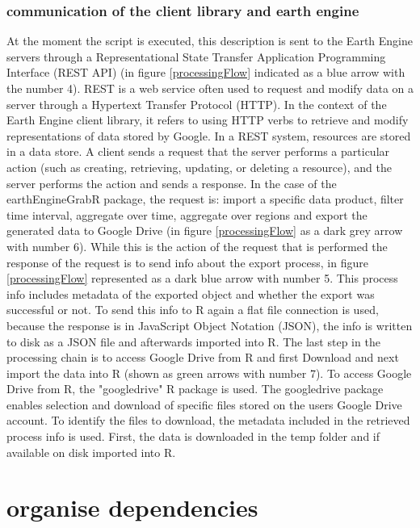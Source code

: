 \subsubsection{communication of the client library and earth engine}

At the moment the script is executed, this description is sent to the Earth Engine servers through a Representational State Transfer Application Programming Interface (REST API) (in figure \ref{processingFlow} indicated as a blue arrow with the number 4). REST is a web service often used to request and modify data on a server through a Hypertext Transfer Protocol (HTTP).
In the context of the Earth Engine client library, it refers to using HTTP verbs to retrieve and modify representations of data stored by Google.
In a REST system, resources are stored in a data store. A client sends a request that the server performs a particular action (such as creating, retrieving, updating, or deleting a resource), and the server performs the action and sends a response. In the case of the earthEngineGrabR package, the request is: import a specific data product, filter time interval, aggregate over time, aggregate over regions and export the generated data to Google Drive (in figure \ref{processingFlow} as a dark grey arrow with number 6). While this is the action of the request that is performed the response of the request is to send info about the export process, in figure \ref{processingFlow} represented as a dark blue arrow with number 5. This process info includes metadata of the exported object and whether the export was successful or not. To send this info to R again a flat file connection is used, because the response is in JavaScript Object Notation (JSON), the info is written to disk as a JSON file and afterwards imported into R. The last step in the processing chain is to access Google Drive from R and first Download and next import the data into R (shown as green arrows with number 7). To access Google Drive from R, the "googledrive" R package is used. The googledrive package enables selection and download of specific files stored on the users Google Drive account. To identify the files to download, the metadata included in the retrieved process info is used. First, the data is downloaded in the temp folder and if available on disk imported into R.



\section{organise dependencies}



